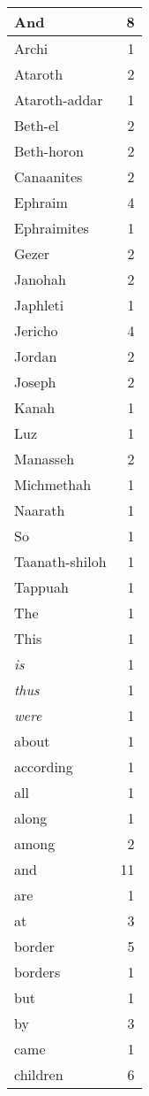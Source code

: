 \begin{center}
\begin{longtable}{l|r}
\hline \hline
\endlastfoot
And & 8 \\ \hline
Archi & 1 \\ \hline
Ataroth & 2 \\ \hline
Ataroth-addar & 1 \\ \hline
Beth-el & 2 \\ \hline
Beth-horon & 2 \\ \hline
Canaanites & 2 \\ \hline
Ephraim & 4 \\ \hline
Ephraimites & 1 \\ \hline
Gezer & 2 \\ \hline
Janohah & 2 \\ \hline
Japhleti & 1 \\ \hline
Jericho & 4 \\ \hline
Jordan & 2 \\ \hline
Joseph & 2 \\ \hline
Kanah & 1 \\ \hline
Luz & 1 \\ \hline
Manasseh & 2 \\ \hline
Michmethah & 1 \\ \hline
Naarath & 1 \\ \hline
So & 1 \\ \hline
Taanath-shiloh & 1 \\ \hline
Tappuah & 1 \\ \hline
The & 1 \\ \hline
This & 1 \\ \hline
\emph{is} & 1 \\ \hline
\emph{thus} & 1 \\ \hline
\emph{were} & 1 \\ \hline
about & 1 \\ \hline
according & 1 \\ \hline
all & 1 \\ \hline
along & 1 \\ \hline
among & 2 \\ \hline
and & 11 \\ \hline
are & 1 \\ \hline
at & 3 \\ \hline
border & 5 \\ \hline
borders & 1 \\ \hline
but & 1 \\ \hline
by & 3 \\ \hline
came & 1 \\ \hline
children & 6 \\ \hline

\end{longtable}
\end{center}
